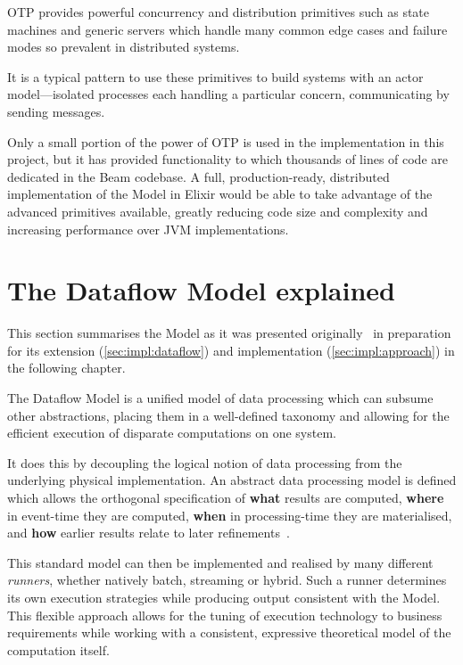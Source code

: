 OTP provides powerful concurrency and distribution primitives such as state machines and generic servers which handle many common edge cases and failure modes so prevalent in distributed systems.

It is a typical pattern to use these primitives to build systems with an actor model---isolated processes each handling a particular concern, communicating by sending messages.

Only a small portion of the power of OTP is used in the implementation in this project, but it has provided functionality to which thousands of lines of code are dedicated in the Beam codebase.
A full, production-ready, distributed implementation of the Model in Elixir would be able to take advantage of the advanced primitives available, greatly reducing code size and complexity and increasing performance over JVM implementations.

\section{The Dataflow Model explained}\label{sec:prep:dataflow}

This section summarises the Model as it was presented originally~\cite{Akidau:2015} in preparation for its extension (\cref{sec:impl:dataflow}) and implementation (\cref{sec:impl:approach}) in the following chapter.

The Dataflow Model is a unified model of data processing which can subsume other abstractions, placing them in a well-defined taxonomy and allowing for the efficient execution of disparate computations on one system.

It does this by decoupling the logical notion of data processing from the underlying physical implementation.
An abstract data processing model is defined which allows the orthogonal specification of \textbf{what} results are computed, \textbf{where} in event-time they are computed, \textbf{when} in processing-time they are materialised, and \textbf{how} earlier results relate to later refinements~\cite[p.~1793]{Akidau:2015}.

This standard model can then be implemented and realised by many different \emph{runners}, whether natively batch, streaming or hybrid. 
Such a runner determines its own execution strategies while producing output consistent with the Model.
This flexible approach allows for the tuning of execution technology to business requirements while working with a consistent, expressive theoretical model of the computation itself.

